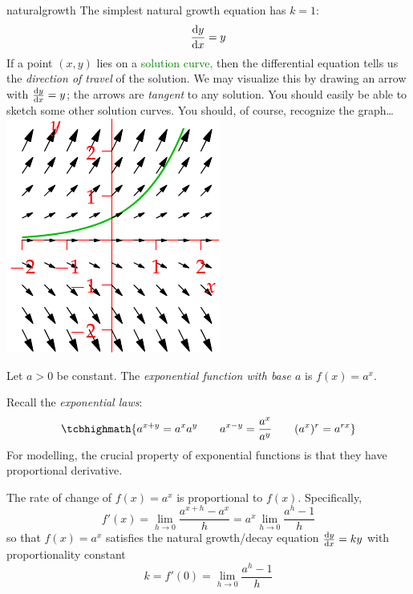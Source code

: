 \begin{example}[lower separated=false, sidebyside, sidebyside align=top seam, sidebyside gap=0pt, righthand width=0.28\linewidth]{}{naturalgrowth}
The simplest natural growth equation has $k=1$:
\[\diff[y]{x}=y\]
If a point $(x,y)$ lies on a \textcolor{Green}{solution curve,} then the differential equation tells us the \emph{direction of travel} of the solution. We may visualize this by drawing an arrow with  $\diff[y]{x}=y$; the arrows are \emph{tangent} to any solution.\footnotemark{} You should easily be able to sketch some other solution curves.\smallbreak
You should, of course, recognize the graph\ldots
\tcblower
\flushright\includegraphics[scale=1]{slopefields-01}
\end{example}



\begin{defn}{}{}
Let $a>0$ be constant. The \emph{exponential function with base $a$} is $f(x)=a^x$.
\end{defn}

Recall the \emph{exponential laws}:\label{pg:explaws}
\[\tcbhighmath{a^{x+y}=a^xa^y\qquad a^{x-y}=\frac{a^x}{a^y}\qquad (a^x)^r=a^{rx}}\]
For modelling, the crucial property of exponential functions is that they have proportional derivative.

\begin{thm}{}{}
The rate of change of $f(x)=a^x$ is proportional to $f(x)$. Specifically,
\[f'(x)=\lim_{h\to 0}\frac{a^{x+h}-a^x}h=a^x\lim_{h\to 0}\frac{a^{h}-1}h\]
so that $f(x)=a^x$ satisfies the natural growth/decay equation $\diff[y]{x}=ky$ with proportionality constant
\[k=f'(0)=\lim_{h\to 0}\frac{a^{h}-1}h\]
\end{thm}

